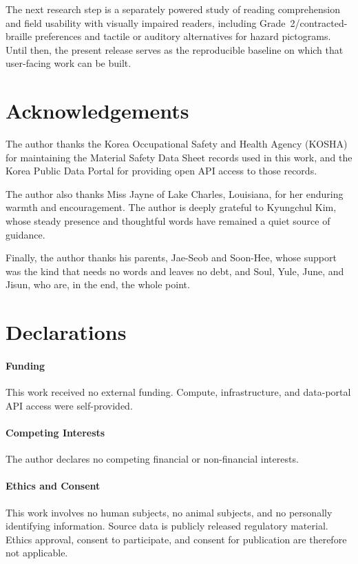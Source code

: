 \documentclass[smallextended]{svjour3}
\begin{document}
The next research step is a separately powered study of reading comprehension and field usability with visually impaired readers, including Grade~2/contracted-braille preferences and tactile or auditory alternatives for hazard pictograms. Until then, the present release serves as the reproducible baseline on which that user-facing work can be built.

\section*{Acknowledgements}

The author thanks the Korea Occupational Safety and Health Agency (KOSHA) for maintaining the Material Safety Data Sheet records used in this work, and the Korea Public Data Portal for providing open API access to those records.

The author also thanks Miss Jayne of Lake Charles, Louisiana, for her enduring warmth and encouragement. The author is deeply grateful to Kyungchul Kim, whose steady presence and thoughtful words have remained a quiet source of guidance.

Finally, the author thanks his parents, Jae-Seob and Soon-Hee, whose support was the kind that needs no words and leaves no debt, and Soul, Yule, June, and Jisun, who are, in the end, the whole point.

\section*{Declarations}

\paragraph{Funding}
This work received no external funding. Compute, infrastructure, and data-portal API access were self-provided.

\paragraph{Competing Interests}
The author declares no competing financial or non-financial interests.

\paragraph{Ethics and Consent}
This work involves no human subjects, no animal subjects, and no personally identifying information. Source data is publicly released regulatory material. Ethics approval, consent to participate, and consent for publication are therefore not applicable.
\end{document}
